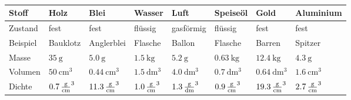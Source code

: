 \documentclass[a4paper]{article}
\begin{document}
\vspace{0.5 cm}

\\


\renewcommand{\arraystretch}{1.8}
\begin{tabular}{|p{1.7 cm}|p{1.7 cm}|p{1.7 cm}|p{1.7 cm}|p{1.7 cm}|p{1.7 cm}|p{1.7 cm}|p{1.7 cm}|}
\hline
Stoff	& Holz & Blei & Wasser & Luft & Speiseöl & Gold & Aluminium \\
\hline 
Zustand & fest & fest & flüssig & gasförmig & flüssig & fest & fest \\
\hline
Beispiel & Bauklotz & Anglerblei & Flasche & Ballon & Flasche & Barren & Spitzer\\
\hline
Masse & $\SI{35}{\gram}$  & $\SI{5,0}{\gram}$  & $\SI{1,5}{\kilo\gram}$  & $\SI{5,2}{\gram}$  & $\SI{0,63}{\kilogram}$  & $\SI{12,4}{\kilogram}$  &$\SI{4,3}{\gram}$  \\
\hline
Volumen &$\SI{50}{\centi\meter^3}$  & $\SI{0,44}{\centi\meter^3}$  &$\SI{1,5}{\deci\meter^3}$  & $\SI{4,0}{\deci\meter^3}$  & $\SI{0,7}{\deci\meter^3 }$  &$\SI{0,64}{\deci\meter^3}$  & $\SI{1,6}{\centi\meter^3}$  \\
\hline
Dichte &$\SI{0,7}{\gram\over\centi\meter^3}$  &$\SI{11,3}{\gram\over\centi\meter^3}$  &$\SI{1,0}{\gram\over\centi\meter^3}$  &$\SI{1,3}{\gram\over \deci\meter^3}$  &$\SI{0,9}{\gram\over\centi\meter^3}$  &$\SI{19,3}{\gram\over\centi\meter^3}$  &$\SI{2,7}{\gram\over\centi\meter^3}$  \\
\hline
\end{tabular}
\vspace{0.5 cm}
\end{document}
